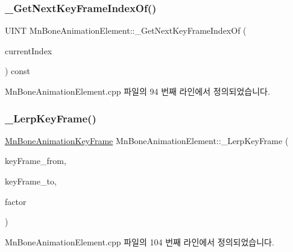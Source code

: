 \subsubsection{\texorpdfstring{\+\_\+\+Get\+Next\+Key\+Frame\+Index\+Of()}{\_GetNextKeyFrameIndexOf()}}
{\footnotesize\ttfamily U\+I\+NT Mn\+Bone\+Animation\+Element\+::\+\_\+\+Get\+Next\+Key\+Frame\+Index\+Of (\begin{DoxyParamCaption}\item[{U\+I\+NT}]{current\+Index }\end{DoxyParamCaption}) const\hspace{0.3cm}{\ttfamily [private]}}



Mn\+Bone\+Animation\+Element.\+cpp 파일의 94 번째 라인에서 정의되었습니다.

\mbox{\label{class_m_n_l_1_1_mn_bone_animation_element_a3e789fbdea899e545eb5ff7a3aa41961}} 
\subsubsection{\texorpdfstring{\+\_\+\+Lerp\+Key\+Frame()}{\_LerpKeyFrame()}}
{\footnotesize\ttfamily \hyperlink{struct_m_n_l_1_1_mn_bone_animation_key_frame}{Mn\+Bone\+Animation\+Key\+Frame} Mn\+Bone\+Animation\+Element\+::\+\_\+\+Lerp\+Key\+Frame (\begin{DoxyParamCaption}\item[{const \hyperlink{struct_m_n_l_1_1_mn_bone_animation_key_frame}{Mn\+Bone\+Animation\+Key\+Frame} \&}]{key\+Frame\+\_\+from,  }\item[{const \hyperlink{struct_m_n_l_1_1_mn_bone_animation_key_frame}{Mn\+Bone\+Animation\+Key\+Frame} \&}]{key\+Frame\+\_\+to,  }\item[{float}]{factor }\end{DoxyParamCaption})\hspace{0.3cm}{\ttfamily [private]}}



Mn\+Bone\+Animation\+Element.\+cpp 파일의 104 번째 라인에서 정의되었습니다.

\mbox{\label{class_m_n_l_1_1_mn_bone_animation_element_a3c4b8bf56a5c5ebf5d6045ae93e5b808}} 
